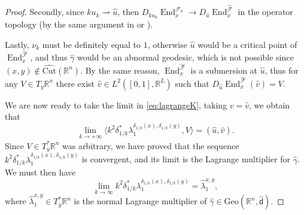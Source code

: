 \documentclass[11pt,a4paper]{article}
\theoremstyle{plain}
\theoremstyle{definition}
\theoremstyle{remark}
\numberwithin{equation}{section}
\newcommand{\R}{\mathbb{R}} %
\newcommand{\Cut}{\mathrm{Cut}}
\DeclareMathOperator{\End}{\mathrm{End}}
\newcommand{\Geo}{\mathrm{Geo}}
\newcommand{\sfd}{\mathsf d}
\begin{document}
\begin{proof}
Secondly, since $ku_k \rightharpoonup \hat{u}$, then $D_{k u_k}\End_x^{\mathscr{F}_k} \to D_{\hat{u}} \End_x^{\hat{\mathscr{F}}}$ in the operator topology (by the same argument in \cite[Prop.\@ 3.7]{Trelatvalue} or  \cite[Appendix, Thm.\@ 23]{LarryBoa}).


Lastly, $\nu_k$ must be definitely equal to $1$, otherwise $\hat{u}$ would be a critical point of $\End_x^{\hat{\mathscr{F}}}$, and thus $\hat{\gamma}$ would be an abnormal geodesic, which is not possible since $(x,y)\notin\widehat{\Cut}(\R^n)$. By the same reason, $\End^{\hat{\mathscr{F}}}_x$ is a submersion at $\hat{u}$, thus for any $V\in T_y \R^n$ there exist $\hat{v} \in L^2([0,1],\R^L)$ such that $D_{\hat{u}}\End_x^{\hat{\mathscr{F}}}(\hat{v})=V$.

We are now ready to take the limit in \eqref{eq:lagrangeK}, taking $v=\hat{v}$, we obtain that
\begin{equation}
\lim_{k\to +\infty} \langle k^2\delta_{1/k}^* \lambda^{\delta_{1/k}(x),\delta_{1/k}(y)}_1,V\rangle = (\hat{u},\hat{v}).
\end{equation}
Since $V\in T_y^*\R^n$ was arbitrary, we have proved that the sequence $k^2\delta_{1/k}^* \lambda^{\delta_{1/k}(x),\delta_{1/k}(y)}_1$ is convergent, and its limit is the Lagrange multiplier for $\hat\gamma$. We must then have
\begin{equation}\label{eq:limitforfinalcov}
\lim_{k\to\infty} k^2 \delta_{1/k}^* \lambda^{\delta_{1/k}(x),\delta_{1/k}(y)}_1= \hat{\lambda}^{x,y}_1,
\end{equation}
where $\hat{\lambda}^{x,y}_1\in T_y^*\R^n$ is the normal Lagrange multiplier of $\hat{\gamma}\in\Geo(\R^n,\hat{\sfd})$. 


\end{proof}
\end{document}
